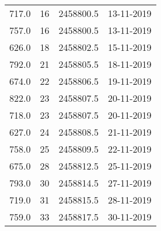 \begin{table}
\begin{tabular}{cccc}
717.0 & 16 & 2458800.5 & 13-11-2019 \\
757.0 & 16 & 2458800.5 & 13-11-2019 \\
626.0 & 18 & 2458802.5 & 15-11-2019 \\
792.0 & 21 & 2458805.5 & 18-11-2019 \\
674.0 & 22 & 2458806.5 & 19-11-2019 \\
822.0 & 23 & 2458807.5 & 20-11-2019 \\
718.0 & 23 & 2458807.5 & 20-11-2019 \\
627.0 & 24 & 2458808.5 & 21-11-2019 \\
758.0 & 25 & 2458809.5 & 22-11-2019 \\
675.0 & 28 & 2458812.5 & 25-11-2019 \\
793.0 & 30 & 2458814.5 & 27-11-2019 \\
719.0 & 31 & 2458815.5 & 28-11-2019 \\
759.0 & 33 & 2458817.5 & 30-11-2019 \\
\end{tabular}
\end{table}
